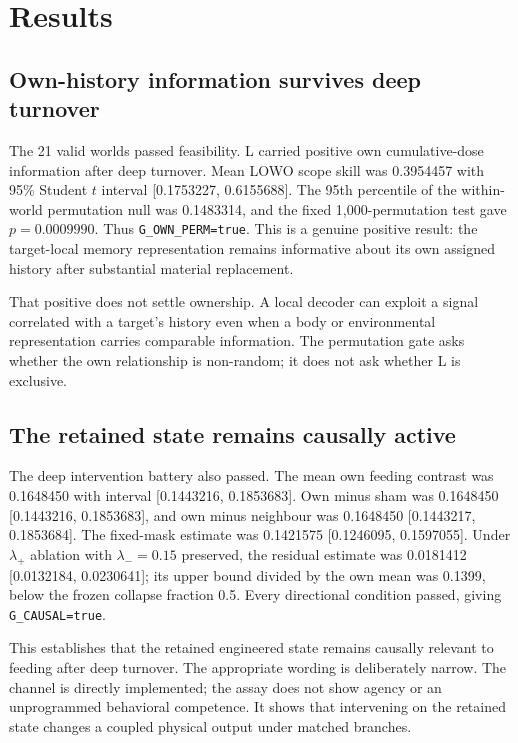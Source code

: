 \documentclass[11pt]{article}
\newcommand{\code}[1]{\texttt{#1}}
\begin{document}
\section{Results}

\subsection{Own-history information survives deep turnover}

The 21 valid worlds passed feasibility. L carried positive own cumulative-dose information after deep turnover. Mean LOWO scope skill was 0.3954457 with 95\% Student $t$ interval [0.1753227, 0.6155688]. The 95th percentile of the within-world permutation null was 0.1483314, and the fixed 1,000-permutation test gave $p=0.0009990$. Thus \code{G\_OWN\_PERM=true}. This is a genuine positive result: the target-local memory representation remains informative about its own assigned history after substantial material replacement.

That positive does not settle ownership. A local decoder can exploit a signal correlated with a target's history even when a body or environmental representation carries comparable information. The permutation gate asks whether the own relationship is non-random; it does not ask whether L is exclusive.

\subsection{The retained state remains causally active}

The deep intervention battery also passed. The mean own feeding contrast was 0.1648450 with interval [0.1443216, 0.1853683]. Own minus sham was 0.1648450 [0.1443216, 0.1853683], and own minus neighbour was 0.1648450 [0.1443217, 0.1853684]. The fixed-mask estimate was 0.1421575 [0.1246095, 0.1597055]. Under $\lambda_+$ ablation with $\lambda_-=0.15$ preserved, the residual estimate was 0.0181412 [0.0132184, 0.0230641]; its upper bound divided by the own mean was 0.1399, below the frozen collapse fraction 0.5. Every directional condition passed, giving \code{G\_CAUSAL=true}.

This establishes that the retained engineered state remains causally relevant to feeding after deep turnover. The appropriate wording is deliberately narrow. The channel is directly implemented; the assay does not show agency or an unprogrammed behavioral competence. It shows that intervening on the retained state changes a coupled physical output under matched branches.
\end{document}
